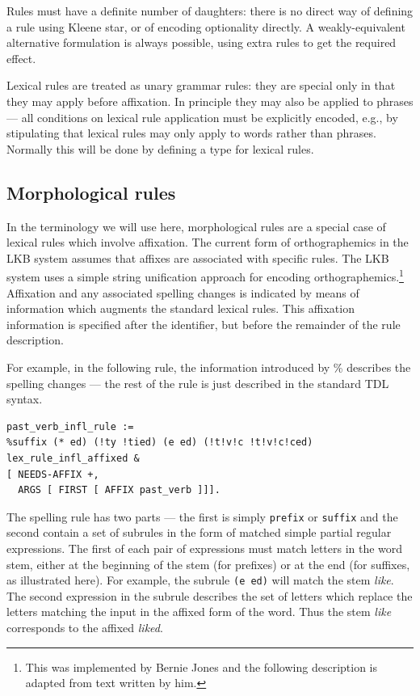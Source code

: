 \documentclass[12pt]{report}
\begin{document}
Rules must have a definite number of daughters: there is no direct way of
defining a rule using Kleene star,
or of encoding optionality directly.  A weakly-equivalent
alternative formulation is always possible,
using extra rules to get the required effect.

Lexical rules are treated as unary grammar rules: 
they are special only in that
they may apply before affixation.  In principle
they may also be applied to phrases ---
all conditions on lexical rule application must be explicitly encoded,
e.g., by stipulating that lexical rules may only apply
to {\type word}s rather than {\type phrase}s.
Normally this will be done by defining a type for lexical rules.

\subsection{Morphological rules}
\label{morphology}

In the terminology we will use here,
morphological rules are a special case of lexical rules which 
involve affixation.  
The current form of orthographemics in the LKB system
assumes that affixes are associated with specific rules.
The LKB system uses a simple string unification approach for encoding
orthographemics.\footnote{This was implemented by Bernie Jones
and the following description is adapted from text written by him.}
Affixation and any associated spelling changes
is indicated by means of information
which augments the standard lexical rules.
This affixation information
is specified after the identifier, but before the remainder 
of the rule description.

For example, in the following rule, the information introduced
by \% describes the spelling changes --- the rest of the rule
is just described in the standard TDL syntax.
\begin{verbatim}
past_verb_infl_rule :=
%suffix (* ed) (!ty !tied) (e ed) (!t!v!c !t!v!c!ced) 
lex_rule_infl_affixed &
[ NEEDS-AFFIX +,
  ARGS [ FIRST [ AFFIX past_verb ]]].
\end{verbatim}
The spelling rule has two parts --- the first is simply \verb+prefix+ or
\verb+suffix+ and the second
contain a set of subrules in the form of matched simple
partial regular expressions. The first of each pair of expressions must match
letters in the word stem, either at the beginning of the stem (for prefixes) or
at the end (for suffixes, as illustrated here).  For example, the
subrule \verb+(e ed)+ will match the stem {\it like}.
The second
expression in the subrule
describes the set of letters which replace
the letters matching the input in the affixed form of the word.
Thus the stem {\it like} corresponds to the affixed {\it liked}.
\end{document}
